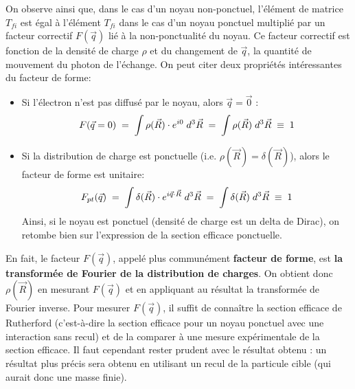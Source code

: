 On observe ainsi que, dans le cas d'un noyau non-ponctuel, l'élément de matrice $T_{fi}$ est égal à l'élément $T_{fi}$ dans le cas d'un noyau ponctuel multiplié par un facteur correctif $F(\vec{q})$ lié à la non-ponctualité du noyau. Ce facteur correctif est fonction de la densité de charge $\rho$ et du changement de $\vec{q}$, la quantité de mouvement du photon de l'échange. On peut citer deux propriétés intéressantes du facteur de forme:
\begin{itemize}[label=$\bullet$]
    \item Si l'électron n'est pas diffusé par le noyau, alors $\vec{q}=\vec{0}$ :
          \begin{equation*}
            F(\vec{q}=0) \; = \; 
            \int \rho(\vec{R}) \cdot e^{i0} \; d^3\vec{R} \; = \;
            \int \rho(\vec{R}) \; d^3\vec{R} \;\equiv\; 1
          \end{equation*}
          
    \item Si la distribution de charge est ponctuelle (i.e. $\rho(\vec{R})= \delta(\vec{R})$), alors le facteur de forme est unitaire:
    \begin{equation*}
        F_{pt}(\vec{q}) \; = \; 
        \int \delta(\vec{R}) \cdot e^{i\vec{q} \cdot\vec{R}} \; d^3\vec{R} \; = \;
        \int \delta(\vec{R}) \; d^3\vec{R} \;\equiv\; 1
    \end{equation*}
    Ainsi, si le noyau est ponctuel (densité de charge est un delta de Dirac), on retombe bien sur l'expression de la section efficace ponctuelle.
\end{itemize}
En fait, le facteur $F(\vec{q})$, appelé plus communément \textbf{facteur de forme}, est \textbf{la transformée de Fourier de la distribution de charges}. On obtient donc $\rho(\vec{R})$ en mesurant $F(\vec{q})$ et en appliquant au résultat la transformée de Fourier inverse. Pour mesurer $F(\vec{q})$, il suffit de connaître la section efficace de Rutherford (c'est-à-dire la section efficace pour un noyau ponctuel avec une interaction sans recul) et de la comparer à une mesure expérimentale de la section efficace. Il faut cependant rester prudent avec le résultat obtenu : un résultat plus précis sera obtenu en utilisant un recul de la particule cible (qui aurait donc une masse finie).\\

